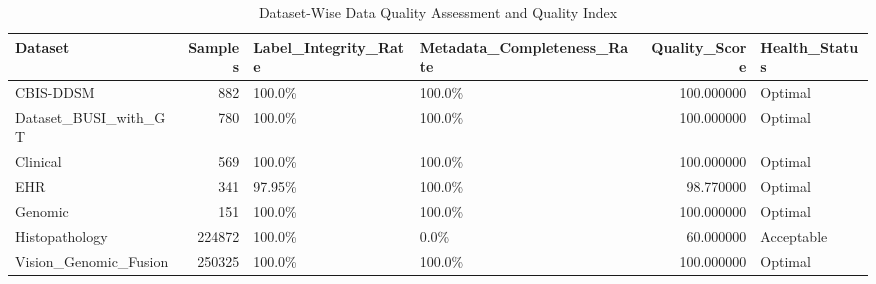 \begin{table}
\caption{Dataset-Wise Data Quality Assessment and Quality Index}
\label{tab:table_dataset_quality_summary}
\begin{tabular}{lrllrl}
\toprule
Dataset & Samples & Label\_Integrity\_Rate & Metadata\_Completeness\_Rate & Quality\_Score & Health\_Status \\
\midrule
CBIS-DDSM & 882 & 100.0\% & 100.0\% & 100.000000 & Optimal \\
Dataset\_BUSI\_with\_GT & 780 & 100.0\% & 100.0\% & 100.000000 & Optimal \\
Clinical & 569 & 100.0\% & 100.0\% & 100.000000 & Optimal \\
EHR & 341 & 97.95\% & 100.0\% & 98.770000 & Optimal \\
Genomic & 151 & 100.0\% & 100.0\% & 100.000000 & Optimal \\
Histopathology & 224872 & 100.0\% & 0.0\% & 60.000000 & Acceptable \\
Vision\_Genomic\_Fusion & 250325 & 100.0\% & 100.0\% & 100.000000 & Optimal \\
\bottomrule
\end{tabular}
\end{table}
